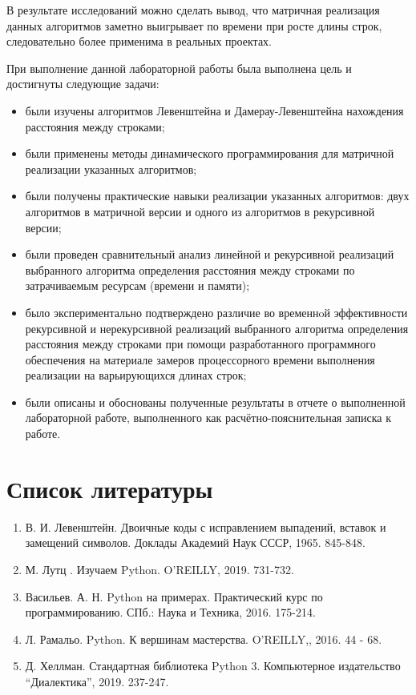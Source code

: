 \documentclass[14pt,russian]{scrartcl}
\newcommand{\anonsection}[1]{\cleardoublepage
\phantomsection
\addcontentsline{toc}{section}{\protect\numberline{}#1}
\section*{#1}\vspace*{2.5ex} %
}
\begin{document}
	В результате исследований можно сделать вывод, что матричная реализация данных алгоритмов заметно выигрывает по времени при росте длины строк, следовательно более применима в реальных проектах.
	\newline
	
	При выполнение данной лабораторной работы была выполнена цель и достигнуты следующие задачи:

	\begin{itemize}
		\item были изучены алгоритмов Левенштейна и Дамерау-Левенштейна нахождения расстояния между строками;
		\item были применены методы динамического программирования для матричной реализации указанных алгоритмов;
		\item были получены практические навыки реализации указанных алгоритмов: двух алгоритмов в матричной версии и одного из алгоритмов в рекурсивной версии;
		\item были проведен сравнительный анализ линейной и рекурсивной реализаций выбранного алгоритма определения расстояния между строками по затрачиваемым ресурсам (времени и памяти);
		\item было экспериментально подтверждено различие во временнoй эффективности рекурсивной и нерекурсивной реализаций выбранного алгоритма определения расстояния между строками при помощи разработанного программного обеспечения на материале замеров процессорного времени выполнения реализации на варьирующихся длинах строк;
		\item были описаны и обоснованы полученные результаты в отчете о выполненной лабораторной работе, выполненного как расчётно-пояснительная записка к работе.
	\end{itemize}

	\anonsection{Список литературы}

	\begin{enumerate}

		\item В. И. Левенштейн. Двоичные коды с исправлением выпадений, вставок и замещений символов. Доклады Академий Наук СССР, 1965. 845-848.
		\item М. Лутц . Изучаем Python. O’REILLY, 2019. 731-732.
		\item Васильев. А. Н. Python на примерах. Практический курс по программированию. СПб.: Наука и Техника, 2016. 175-214.
		\item Л. Рамальо. Python. К вершинам мастерства. O’REILLY,, 2016. 44 - 68.
		\item Д. Хеллман. Стандартная библиотека Python 3. Компьютерное издательство “Диалектика'', 2019. 237-247.

	\end{enumerate}
\end{document}
